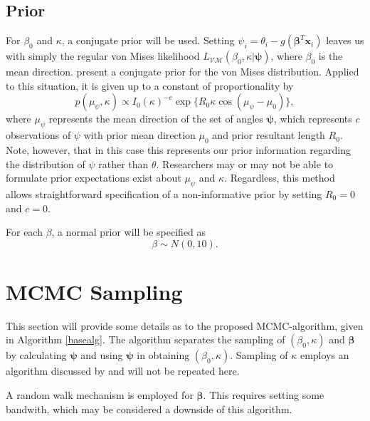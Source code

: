 \documentclass[12pt,a4paper]{article}\usepackage[]{graphicx}\usepackage[]{color}
\begin{document}
\subsection{Prior}

For $\beta_0$ and $\kappa$, a conjugate prior will be used. Setting $\psi_i = \theta_i - g(\boldsymbol\beta^T \boldsymbol{x}_i)$ leaves us with simply the regular von Mises likelihood $L_{\mathcal{VM}}(\beta_0, \kappa \vert \boldsymbol\psi)$, where $\beta_0$ is the mean direction. \citet{guttorp1988finding} present a conjugate prior for the von Mises distribution. Applied to this situation, it is given up to a constant of proportionality by
\begin{equation}
p(\mu_{\psi}, \kappa) \propto  I_0 (\kappa) ^{-c} \exp\{R_0 \kappa \cos (\mu_{\psi} - \mu_0)\},
\end{equation}
where $\mu_{\psi}$ represents the mean direction of the set of angles $\boldsymbol\psi$,  which represents $c$ observations of $\psi$ with prior mean direction $\mu_0$ and prior resultant length $R_0$. Note, however, that in this case this represents our prior information regarding the distribution of $\psi$ rather than $\theta$. Researchers may or may not be able to formulate prior expectations exist about $\mu_{\psi}$ and $\kappa$. Regardless, this method allows straightforward specification of a non-informative prior by setting $R_0 = 0$ and $c = 0$.

For each $\beta$, a normal prior will be specified as
\begin{equation}
\beta \sim N(0, 10).
\end{equation}

\section{MCMC Sampling}

This section will provide some details as to the proposed MCMC-algorithm, given in Algorithm \ref{basealg}. The algorithm separates the sampling of $(\beta_0, \kappa)$ and $\boldsymbol\beta$ by calculating $\boldsymbol\psi$ and using $\boldsymbol\psi$ in obtaining $(\beta_0, \kappa)$. Sampling of $\kappa$ employs an algorithm discussed by \citet{forbes2014fast} and will not be repeated here.

A random walk mechanism is employed for $\boldsymbol\beta$. This requires setting some bandwith, which may be considered a downside of this algorithm.
\end{document}
